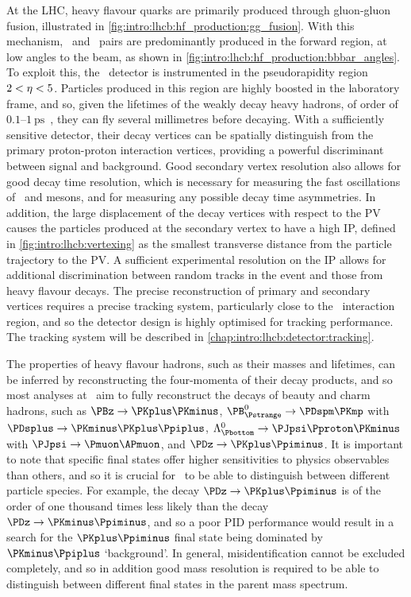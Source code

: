 At the \ac{LHC}, heavy flavour quarks are primarily produced through 
gluon-gluon fusion, illustrated in 
\cref{fig:intro:lhcb:hf_production:gg_fusion}.
With this mechanism, \bbbar\ and \ccbar\ pairs are predominantly produced in 
the forward region, at low angles to the beam, as shown in 
\cref{fig:intro:lhcb:hf_production:bbbar_angles}.
To exploit this, the \lhcb\ detector is instrumented in the pseudorapidity 
region $2 < \eta < 5$.
Particles produced in this region are highly boosted in the laboratory frame, 
and so, given the lifetimes of the weakly decay heavy hadrons, of order of 
$0.1$--$\SI{1}{\pico\second}$~\cite{PDG2014}, they can fly several millimetres 
before decaying.
With a sufficiently sensitive detector, their decay vertices can be spatially 
distinguish from the primary proton-proton interaction vertices, providing a 
powerful discriminant between signal and background.
Good secondary vertex resolution also allows for good decay time resolution, 
which is necessary for measuring the fast oscillations of \PBds\ and \PDzero 
mesons, and for measuring any possible decay time asymmetries.
In addition, the large displacement of the decay vertices with respect to the 
\ac{PV} causes the particles produced at the secondary vertex to have a high 
\ac{IP}, defined in \cref{fig:intro:lhcb:vertexing} as the smallest transverse 
distance from the particle trajectory to the \ac{PV}.
A sufficient experimental resolution on the \ac{IP} allows for additional 
discrimination between random tracks in the event and those from heavy flavour 
decays.
The precise reconstruction of primary and secondary vertices requires a precise 
tracking system, particularly close to the \pp\ interaction region, and so the 
detector design is highly optimised for tracking performance.
The tracking system will be described in 
\cref{chap:intro:lhcb:detector:tracking}.

The properties of heavy flavour hadrons, such as their masses and lifetimes, 
can be inferred by reconstructing the four-momenta of their decay products, and 
so most analyses at \lhcb\ aim to fully reconstruct the decays of beauty and 
charm hadrons, such as $\decay{\PBz}{\PKplus\PKminus}$, 
$\decay{\PBs}{\PDspm\PKmp}$ with $\decay{\PDsplus}{\PKminus\PKplus\Ppiplus}$, 
$\decay{\PLambdab}{\PJpsi\Pproton\PKminus}$ with 
$\decay{\PJpsi}{\Pmuon\APmuon}$, and $\decay{\PDz}{\PKplus\Ppiminus}$.
It is important to note that specific final states offer higher sensitivities 
to physics observables than others, and so it is crucial for \lhcb\ to be able 
to distinguish between different particle species.
For example, the decay $\decay{\PDz}{\PKplus\Ppiminus}$ is of the order of one 
thousand times less likely than the decay $\decay{\PDz}{\PKminus\Ppiminus}$, 
and so a poor \ac{PID} performance would result in a search for the 
$\PKplus\Ppiminus$ final state being dominated by $\PKminus\Ppiplus$ 
`background'.
In general, misidentification cannot be excluded completely, and so in addition 
good mass resolution is required to be able to distinguish between different 
final states in the parent mass spectrum.

